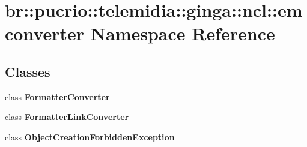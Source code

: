 \section{br::pucrio::telemidia::ginga::ncl::emconverter Namespace Reference}
\label{namespacebr_1_1pucrio_1_1telemidia_1_1ginga_1_1ncl_1_1emconverter}


\subsection*{Classes}
\begin{CompactItemize}
\item 
class {\bf FormatterConverter}
\item 
class {\bf FormatterLinkConverter}
\item 
class {\bf ObjectCreationForbiddenException}
\end{CompactItemize}
